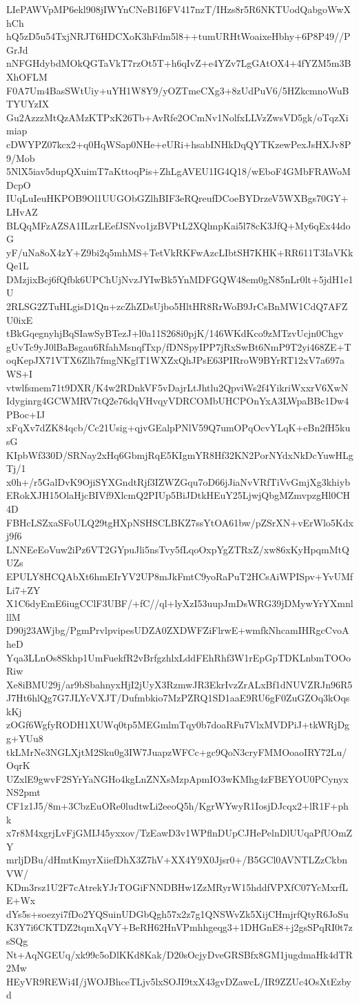 LIePAWVpMP6ekl908jIWYnCNeB1I6FV417nzT/IHzs8r5R6NKTUodQabgoWwXhCh
hQ5zD5u54TxjNRJT6HDCXoK3hFdm5l8++tumURHtWoaixeHbhy+6P8P49//PGrJd
nNFGHdybdMOkQGTaVkT7rzOt5T+h6qIvZ+e4YZv7LgGAtOX4+4fYZM5m3BXhOFLM
F0A7Um4BasSWtUiy+uYH1W8Y9/yOZTmeCXg3+8zUdPuV6/5HZkcmnoWuBTYUYzIX
Gu2AzzzMtQzAMzKTPxK26Tb+AvRfe2OCmNv1NolfxLLVzZwsVD5gk/oTqzXimiap
cDWYPZ07kcx2+q0HqWSap0NHe+eURi+hsabINHkDqQYTKzewPexJsHXJv8P9/Mob
5NlX5iav5dupQXuimT7aKttoqPis+ZhLgAVEU1IG4Q18/wEboF4GMbFRAWoMDcpO
IUqLuIeuHKPOB9Ol1UUGObGZlhBIF3eRQreufDCoeBYDrzeV5WXBgs70GY+LHvAZ
BLQqMFzAZSA1ILzrLEefJSNvo1jzBVPtL2XQlmpKai5l78cK3JfQ+My6qEx44doG
yF/uNa8oX4zY+Z9bi2q5mhMS+TetVkRKFwAzcLIbtSH7KHK+RR611T3IaVKkQe1L
DMzjixBcj6fQfbk6UPChUjNvzJYIwBk5YnMDFGQW48em0gN85nLr0lt+5jdH1e1U
2RLSG2ZTuHLgisD1Qn+zcZhZDsUjbo5HltHR8RrWoB9JrCsBnMW1CdQ7AFZU0ixE
tBkGqegnyhjBqSIawSyBTezJ+l0a11S268i0pjK/146WKdKco9zMTzvUcjn0Chgv
gUvTc9yJ0lBaBsgau6RfahMsnqfTxp/fDNSpyIPP7jRxSwBt6NmP9T2yi468ZE+T
oqKepJX71VTX6Zlh7fmgNKglT1WXZxQhJPsE63PIRroW9BYrRT12xV7a697aWS+I
vtwlfsmem71t9DXR/K4w2RDnkVF5vDajrLtJhtlu2QpviWs2f4YikriWxxrV6XwN
Idyginrg4GCWMRV7tQ2e76dqVHvqyVDRCOMbUHCPOnYxA3LWpaBBc1Dw4PBoc+IJ
xFqXv7dZK84qcb/Cc21Usig+qjvGEalpPNlV59Q7umOPqOcvYLqK+eBn2fH5kusG
KIpbWf330D/SRNay2xHq6GbmjRqE5KIgmYR8Hf32KN2PorNYdxNkDcYuwHLgTj/1
x0h+/r5GalDvK9OjiSYXGndtRjf3IZWZGqu7oD66jJiaNvVRfTiVvGmjXg3khiyb
ERokXJH15OlaHjcBIVf9XlcmQ2PIUp5BiJDtkHEuY25LjwjQbgMZmvpzgHl0CH4D
FBHcLSZxaSFoULQ29tgHXpNSHSCLBKZ7ssYtOA61bw/pZSrXN+vErWlo5Kdxj9f6
LNNEeEoVuw2iPz6VT2GYpuJli5nsTvy5fLqoOxpYgZTRxZ/xw86xKyHpqmMtQUZs
EPULY8HCQAbXt6hmEIrYV2UP8mJkFmtC9yoRaPuT2HCsAiWPISpv+YvUMfLi7+ZY
X1C6dyEmE6iugCClF3UBF/+fC//ql+lyXzI53uupJmDsWRG39jDMywYrYXmnlllM
D90j23AWjbg/PgmPrvlpvipesUDZA0ZXDWFZiFlrwE+wmfkNhcamIHRgcCvoAheD
Yqa3LLnOs8Skhp1UmFuekfR2vBrfgzhlxLddFEhRhf3W1rEpGpTDKLnbmTOOoRiw
Xe8iBMU29j/ar9bSbahnyxHjI2jUyX3RzmwJR3EkrIvzZrALxBf1dNUVZRJn96R5
J7Ht6hlQg7G7JLYcVXJT/Dufmbkio7MzPZRQ1SD1aaE9RU6gF0ZuGZOq3kOqskKj
zOGf6WgfyRODH1XUWq0tp5MEGmlmTqy0b7doaRFu7VlxMVDPiJ+tkWRjDgg+YUu8
tkLMrNe3NGLXjtM2Sku0g3IW7JuapzWFCc+gc9QoN3cryFMMOoaoIRY72Lu/OqrK
UZxlE9gwvF2SYrYaNGHo4kgLnZNXsMzpApmIO3wKMhg4zFBEYOU0PCynyxNS2pmt
CF1z1J5/8m+3CbzEuORe0ludtwLi2eeoQ5h/KgrWYwyR1IosjDJcqx2+lR1F+phk
x7r8M4xgrjLvFjGMIJ45yxxov/TzEawD3v1WPflnDUpCJHePelnDlUUqaPfUOmZY
mrljDBu/dHmtKmyrXiiefDhX3Z7hV+XX4Y9X0Jjsr0+/B5GCl0AVNTLZzCkbnVW/
KDm3rsz1U2F7cAtrekYJrTOGiFNNDBHw1ZzMRyrW15hddfVPXfC07YcMxrfLE+Wx
dYs5s+soezyi7fDo2YQSuinUDGbQgh57x2z7g1QNSWvZk5XijCHmjrfQtyR6JoSu
K3Y7i6CKTDZ2tqmXqVY+BeRH62HnVPmhhgeqg3+1DHGnE8+j2gsSPqRI0t7zsSQg
Nt+AqNGEUq/xk99c5oDlKKd8Kak/D20sOcjyDveGRSBfx8GM1jugdmaHk4dTR2Mw
HEyVR9REWi4I/jWOJBhceTLjv5lxSOJI9txX43gvDZawcL/IR9ZZUc4OsXtEzbyd

